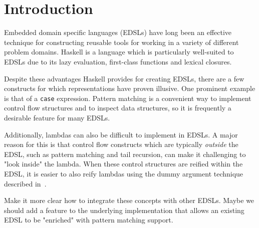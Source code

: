 \documentclass[runningheads, a4paper]{llncs}
\newcommand{\ttt}{\texttt}
\newcommand{\showtodos}{}  %
\newenvironment{todo}
  {\ifthenelse{\isundefined{\showtodos}}{\comment}{\begin{tcolorbox}
    \textbf{TODO}:}}
  {\ifthenelse{\isundefined{\showtodos}}{\endcomment}{\end{tcolorbox}}
  }
\begin{document}




\section{Introduction}

Embedded domain specific languages (EDSLs) have long been an effective
technique for constructing reusable tools for working in a variety of
different problem domains. Haskell is a language which is particularly
well-suited to EDSLs due to its lazy evaluation, first-class functions and
lexical closures.

Despite these advantages Haskell provides for creating EDSLs, there are a few
constructs for which representations have proven illusive. One prominent example
is that of a \ttt{case} expression. Pattern matching is a convenient way to
implement control flow structures and to inspect data structures, so it is
frequently a desirable feature for many EDSLs.

Additionally, lambdas can also be difficult to implement in EDSLs. A major reason
for this is that control flow constructs which are typically \textit{outside} the EDSL,
such as pattern matching and tail recursion, can make it challenging to "look inside"
the lambda. When these control structures are reified within the EDSL, it is
easier to also reify lambdas using the dummy argument technique described in~\cite{Elliott:03:CompileDSEL-JFP}.


\begin{todo}
  Make it more clear how to integrate these concepts with other EDSLs. Maybe we should
  add a feature to the underlying implementation that allows an existing EDSL to be
  "enriched" with pattern matching support.
\end{todo}
\end{document}
